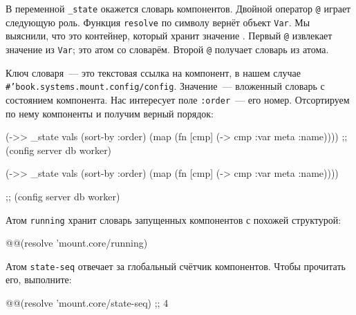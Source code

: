 \fi


В переменной \verb|_state| окажется словарь компонентов. Двойной оператор
\verb|@| играет следующую роль. Функция \verb|resolve| по символу вернёт
объект \verb|Var|. Мы выяснили, что это контейнер, который хранит
значение . Первый \verb|@| извлекает значение из
\verb|Var|; это атом со словарём. Второй \verb|@| получает словарь из атома.

Ключ словаря~--- это текстовая ссылка на компонент, в нашем случае
\texttt{\#'book.systems.mount\-.config/config}. Значение~--- вложенный словарь с
состоянием компонента. Нас интересует поле \verb|:order|~--- его
номер. Отсортируем по нему компоненты и получим верный порядок:

\ifafive

\begin{english}
  \begin{clojure}
(->> _state
     vals (sort-by :order)
     (map (fn [cmp]
            (-> cmp :var meta :name))))
;; (config server db worker)
  \end{clojure}
\end{english}

\else

\begin{english}
  \begin{clojure}
(->> _state
     vals
     (sort-by :order)
     (map (fn [cmp]
            (-> cmp :var meta :name))))

;; (config server db worker)
  \end{clojure}
\end{english}

\fi

Атом \verb|running| хранит словарь запущенных компонентов с похожей структурой:

\begin{english}
  \begin{clojure}
@@(resolve 'mount.core/running)
  \end{clojure}
\end{english}

Атом \verb|state-seq| отвечает за глобальный счётчик компонентов. Чтобы
прочитать его, выполните:

\begin{english}
  \begin{clojure}
@@(resolve 'mount.core/state-seq) ;; 4
  \end{clojure}
\end{english}

